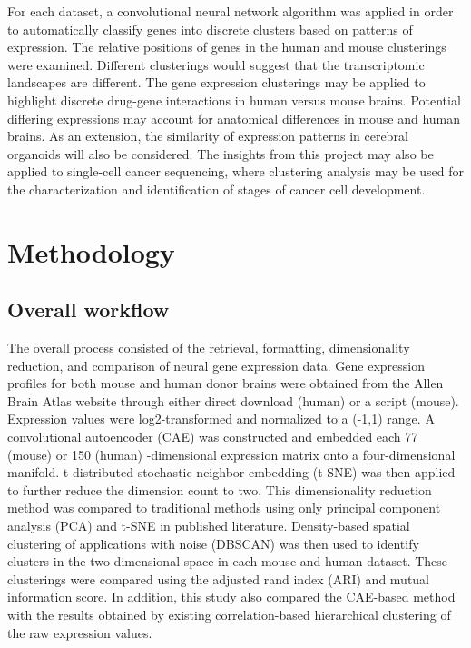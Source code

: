 \documentclass[12pt,oneside,onecolumn,a4paper]{article}
\begin{document}
For each dataset, a convolutional neural network algorithm was applied in order to automatically classify genes into discrete clusters based on patterns of expression. The relative positions of genes in the human and mouse clusterings were examined. Different clusterings would suggest that the transcriptomic landscapes are different. The gene expression clusterings may be applied to highlight discrete drug-gene interactions in human versus mouse brains. Potential differing expressions may account for anatomical differences in mouse and human brains. As an extension, the similarity of expression patterns in cerebral organoids will also be considered. The insights from this project may also be applied to single-cell cancer sequencing, where clustering analysis may be used for the characterization and identification of stages of cancer cell development.

\section{Methodology}

\subsection{Overall workflow}

The overall process consisted of the retrieval, formatting, dimensionality reduction, and comparison of neural gene expression data. Gene expression profiles for both mouse and human donor brains were obtained from the Allen Brain Atlas website through either direct download (human) or a script (mouse). Expression values were log2-transformed and normalized to a (-1,1) range. A convolutional autoencoder (CAE) was constructed and embedded each 77 (mouse) or 150 (human) -dimensional expression matrix onto a four-dimensional manifold. t-distributed stochastic neighbor embedding (t-SNE) was then applied to further reduce the dimension count to two. This dimensionality reduction method was compared to traditional methods using only principal component analysis (PCA) and t-SNE in published literature. Density-based spatial clustering of applications with noise (DBSCAN) was then used to identify clusters in the two-dimensional space in each mouse and human dataset. These clusterings were compared using the adjusted rand index (ARI) and mutual information score. In addition, this study also compared the CAE-based method with the results obtained by existing correlation-based hierarchical clustering of the raw expression values.
\end{document}

